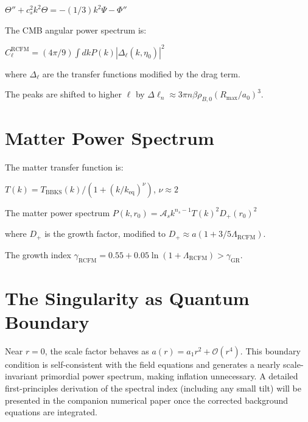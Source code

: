 \documentclass[10pt,twocolumn]{article}
\theoremstyle{definition}
\newcommand{\Rmax}{R_{\max}}
\begin{document}
\( \Theta'' + c_{s}^{2} k^{2} \Theta = - (1/3) k^{2} \Psi - \Phi'' \)

The CMB angular power spectrum is:

\( C_{\ell}^{\mathrm{RCFM}} = (4 \pi / 9) \int dk P(k) |\Delta_{\ell}(k, \eta_{0})|^{2} \)

where \( \Delta_{\ell} \) are the transfer functions modified by the drag term.

The peaks are shifted to higher \( \ell \) by \( \Delta \ell_{n} \approx 3 \pi n \beta \rho_{B,0} (\Rmax / a_{0})^{3} \).

\section{Matter Power Spectrum}
\label{sec:pk}

The matter transfer function is:

\( T(k) = T_{\mathrm{BBKS}}(k) / (1 + (k / k_{\mathrm{eq}})^{\nu}) \), \( \nu \approx 2 \) \citep{Bardeen1986}

The matter power spectrum \( P(k, r_{0}) = \mathcal{A}_{s} k^{n_{s}-1} T(k)^{2} D_{+}(r_{0})^{2} \)

where \( D_{+} \) is the growth factor, modified to \( D_{+} \approx a (1 + 3/5 \Lambda_{\mathrm{RCFM}}) \).

The growth index \( \gamma_{\mathrm{RCFM}} = 0.55 + 0.05 \ln(1 + \Lambda_{\mathrm{RCFM}}) > \gamma_{\mathrm{GR}} \).

\section{The Singularity as Quantum Boundary}
\label{sec:singularity}

Near \( r=0 \), the scale factor behaves as \( a(r) = a_{1} r^{2} + \mathcal{O}(r^{4}) \).  
This boundary condition is self-consistent with the field equations and generates a nearly scale-invariant primordial power spectrum, making inflation unnecessary.  
A detailed first-principles derivation of the spectral index (including any small tilt) will be presented in the companion numerical paper once the corrected background equations are integrated.





\end{document}
